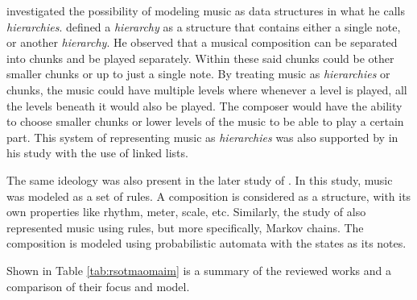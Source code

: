 \citet{buxton1978the} investigated the possibility of modeling music as data structures in what he calls \textit{hierarchies}. \citeauthor{buxton1978the} defined a \textit{hierarchy} as a structure that contains either a single note, or another \textit{hierarchy}. He observed that a musical composition can be separated into chunks and be played separately. Within these said chunks could be other smaller chunks or up to just a single note. By treating music as \textit{hierarchies} or chunks, the music could have multiple levels where whenever a level is played, all the levels beneath it would also be played. The composer would have the ability to choose smaller chunks or lower levels of the music to be able to play a certain part. This system of representing music as \textit{hierarchies} was also supported by \citet{brinkman1984data} in his study with the use of linked lists. 

The same ideology was also present in the later study of \citet{bozhanov2014computoser}. In this study, music was modeled as a set of rules. A composition is considered as a structure, with its own properties like rhythm, meter, scale, etc. Similarly, the study of \citep{schulze2011music} also represented music using rules, but more specifically, Markov chains. The composition is modeled using probabilistic automata with the states as its notes.

Shown in Table \ref{tab:rsotmaomaim} is a summary of the reviewed works and a comparison of their focus and model.

